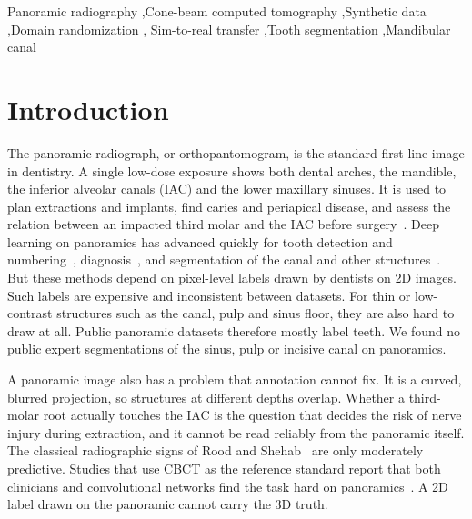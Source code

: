 \documentclass[preprint,12pt]{elsarticle}
\begin{document}
\begin{frontmatter}
\begin{keyword}
Panoramic radiography \sep Cone-beam computed tomography \sep Synthetic data \sep Domain randomization \sep
Sim-to-real transfer \sep Tooth segmentation \sep Mandibular canal
\end{keyword}

\end{frontmatter}

\section{Introduction}

The panoramic radiograph, or orthopantomogram, is the standard first-line image in dentistry. A single low-dose exposure
shows both dental arches, the mandible, the inferior alveolar canals (IAC) and the lower maxillary sinuses. It is used to
plan extractions and implants, find caries and periapical disease, and assess the relation between an impacted third
molar and the IAC before surgery~\cite{mallya2018}. Deep learning on panoramics has advanced quickly for tooth detection
and numbering~\cite{tuzoff2019,jader2018}, diagnosis~\cite{hamamci2023}, and segmentation of the canal and other
structures~\cite{vinayahalingam2019,cha2021,aung2024}. But these methods depend on pixel-level labels drawn by dentists
on 2D images. Such labels are expensive and inconsistent between datasets. For thin or low-contrast structures such as
the canal, pulp and sinus floor, they are also hard to draw at all. Public panoramic datasets therefore mostly label
teeth. We found no public expert segmentations of the sinus, pulp or incisive canal on panoramics.

A panoramic image also has a problem that annotation cannot fix. It is a curved, blurred projection, so structures at
different depths overlap. Whether a third-molar root actually touches the IAC is the question that decides the risk of
nerve injury during extraction, and it cannot be read reliably from the panoramic itself. The classical radiographic
signs of Rood and Shehab~\cite{rood1990} are only moderately predictive. Studies that use CBCT as the reference standard
report that both clinicians and convolutional networks find the task hard on
panoramics~\cite{fukuda2020,jeon2023,ulusoy2025}. A 2D label drawn on the panoramic cannot carry the 3D truth.
\end{document}
